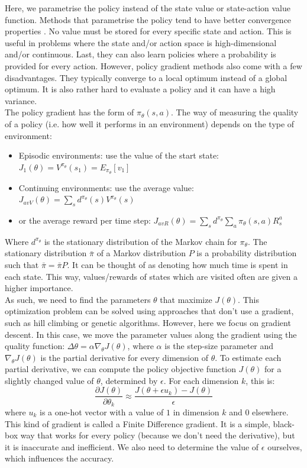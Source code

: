 \documentclass[a4paper]{article}
\begin{document}
Here, we parametrise the policy instead of the state value or state-action value function.
Methods that parametrise the policy tend to have better convergence properties \citep{Sutton1999PolicyApproximation}. 
No value must be stored for every specific state and action. This is useful in problems where the state and/or action space is high-dimensional and/or continuous. Last, they can also learn policies where a probability is provided for every action.
However, policy gradient methods also come with a few disadvantages. They typically converge to a local optimum instead of a global optimum. It is also rather hard to evaluate a policy and it can have a high variance.\\
The policy gradient has the form of $\pi_{\theta}(s,a)$. The way of measuring the quality of a policy (i.e. how well it performs in an environment) depends on the type of environment:
\begin{itemize}
\item Episodic environments: use the value of the start state: $J_1(\theta) = V^{\pi_{\theta}}(s_1) = E_{\pi_{\theta}} [v_1]$
\item Continuing environments: use the average value: $J_{avV}(\theta) = \sum_s d^{\pi_{\theta}}(s)V^{\pi_{\theta}}(s)$
\item or the average reward per time step: $J_{avR}(\theta) = \sum_s d^{\pi_{\theta}} \sum_a \pi_{\theta}(s,a) R_s^a$
\end{itemize}
Where $d^{\pi_{\theta}}$ is the stationary distribution of the Markov chain for $\pi_{\theta}$. The stationary distribution $\bar{\pi}$ of a Markov distribution $P$ is a probability distribution such that $\bar{\pi} = \bar{\pi} P$. It can be thought of as denoting how much time is spent in each state. This way, values/rewards of states which are visited often are given a higher importance.\\
As such, we need to find the parameters $\theta$ that maximize $J(\theta)$. This optimization problem can be solved using approaches that don't use a gradient, such as hill climbing or genetic algorithms. However, here we focus on gradient descent. In this case, we move the parameter values along the gradient using the quality function: $\Delta \theta = \alpha \nabla_{\theta} J(\theta)$, where $\alpha$ is the step-size parameter and $\nabla_{\theta} J(\theta)$ is the partial derivative for every dimension of $\theta$. To estimate each partial derivative, we can compute the policy objective function $J(\theta)$ for a slightly changed value of $\theta$, determined by $\epsilon$. For each dimension $k$, this is:
\begin{equation}
\frac{\partial J(\theta)}{\partial \theta_k} \approx \frac{J(\theta + \epsilon u_k) - J(\theta)}{\epsilon}
\end{equation}
where $u_k$ is a one-hot vector with a value of $1$ in dimension $k$ and $0$ elsewhere. This kind of gradient is called a Finite Difference gradient. It is a simple, black-box way that works for every policy (because we don't need the derivative), but it is inaccurate and inefficient. We also need to determine the value of $\epsilon$ ourselves, which influences the accuracy.\\
\end{document}
